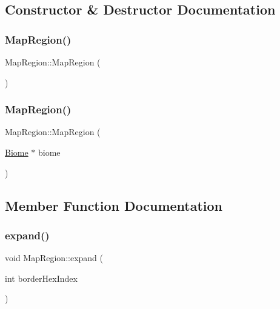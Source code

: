 \subsection{Constructor \& Destructor Documentation}
\mbox{\label{class_map_region_afa7078c0adce53bf31c78672cb20e19c}} 
\subsubsection{\texorpdfstring{Map\+Region()}{MapRegion()}\hspace{0.1cm}{\footnotesize\ttfamily [1/2]}}
{\footnotesize\ttfamily Map\+Region\+::\+Map\+Region (\begin{DoxyParamCaption}{ }\end{DoxyParamCaption})}

\mbox{\label{class_map_region_a4c83b6de01e0d376629224f121cbb160}} 
\subsubsection{\texorpdfstring{Map\+Region()}{MapRegion()}\hspace{0.1cm}{\footnotesize\ttfamily [2/2]}}
{\footnotesize\ttfamily Map\+Region\+::\+Map\+Region (\begin{DoxyParamCaption}\item[{\hyperlink{class_biome}{Biome} $\ast$}]{biome }\end{DoxyParamCaption})}



\subsection{Member Function Documentation}
\mbox{\label{class_map_region_a25c75949874913978d51684c6d74c268}} 
\subsubsection{\texorpdfstring{expand()}{expand()}}
{\footnotesize\ttfamily void Map\+Region\+::expand (\begin{DoxyParamCaption}\item[{int}]{border\+Hex\+Index }\end{DoxyParamCaption})\hspace{0.3cm}{\ttfamily [private]}}

